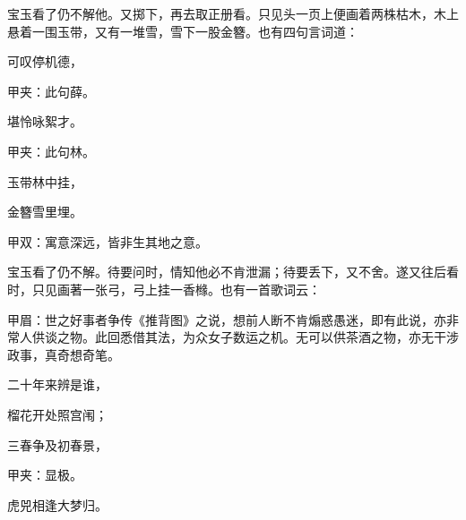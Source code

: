 \begin{parag}
    宝玉看了仍不解他。又掷下，再去取正册看。只见头一页上便画着两株枯木，木上悬着一围玉带，又有一堆雪，雪下一股金簪。也有四句言词道：
\end{parag}


\begin{poem}
    \begin{pl}可叹停机德，\end{pl}\begin{note}甲夹：此句薛。\end{note}

    \begin{pl}堪怜咏絮才。\end{pl}\begin{note}甲夹：此句林。\end{note}

    \begin{pl}玉带林中挂，\end{pl}

    \begin{pl}金簪雪里埋。\end{pl}\begin{note}甲双：寓意深远，皆非生其地之意。\end{note}

\end{poem}


\begin{parag}
    宝玉看了仍不解。待要问时，情知他必不肯泄漏；待要丢下，又不舍。遂又往后看时，只见画著一张弓，弓上挂一香橼。也有一首歌词云：\begin{note}甲眉：世之好事者争传《推背图》之说，想前人断不肯煽惑愚迷，即有此说，亦非常人供谈之物。此回悉借其法，为众女子数运之机。无可以供茶酒之物，亦无干涉政事，真奇想奇笔。\end{note}
\end{parag}


\begin{poem}
    \begin{pl}二十年来辨是谁，\end{pl}

    \begin{pl}榴花开处照宫闱；\end{pl}

    \begin{pl}三春争及初春景，\end{pl}\begin{note}甲夹：显极。\end{note}

    \begin{pl}虎兕相逢大梦归。\end{pl}
\end{poem}


